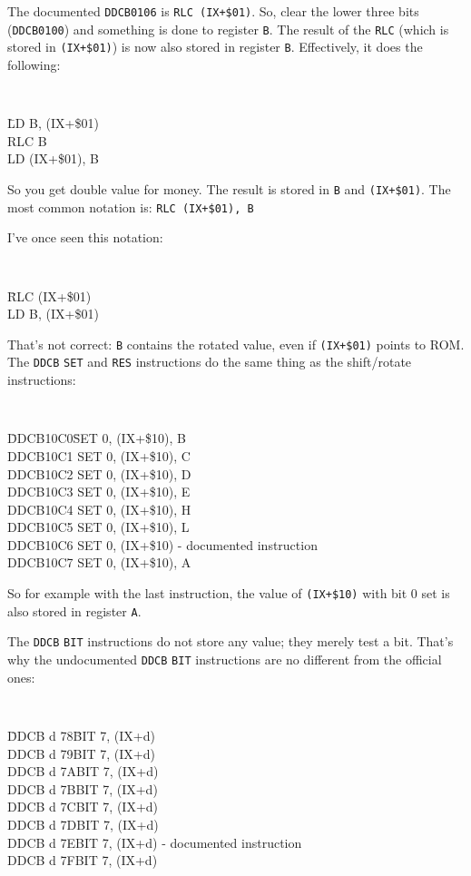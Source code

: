 The documented {\tt DDCB0106} is {\tt RLC (IX+\$01)}. So, clear the lower three bits ({\tt DDCB0100}) and something is done to register {\tt B}. The result of the {\tt RLC} (which is stored in {\tt (IX+\$01)}) is now also stored in register {\tt B}. Effectively, it does the following:

{\tt 
	\begin{tabbing}
		{\qquad}\=LD B, (IX+\$01)\+\\
		RLC B\\
		LD (IX+\$01), B
	\end{tabbing}
}

So you get double value for money. The result is stored in {\tt B} and {\tt (IX+\$01)}. The most common notation is: {\tt RLC (IX+\$01), B}

I've once seen this notation:
 
{\tt 
	\begin{tabbing}
		{\qquad}\=RLC (IX+\$01)\+\\
		LD B, (IX+\$01)
	\end{tabbing}
}

That's not correct: {\tt B} contains the rotated value, even if {\tt (IX+\$01)} points to ROM. The {\tt DDCB} {\tt SET} and {\tt RES} instructions do the same thing as the shift/rotate instructions:

{\tt 
	\begin{tabbing}
		{\qquad}\=DDCB10C0{\qquad}\=SET 0, (IX+\$10), B\+\\
		DDCB10C1	\>SET 0, (IX+\$10), C\\
		DDCB10C2	\>SET 0, (IX+\$10), D\\
		DDCB10C3	\>SET 0, (IX+\$10), E\\
		DDCB10C4	\>SET 0, (IX+\$10), H\\
		DDCB10C5	\>SET 0, (IX+\$10), L\\
		DDCB10C6	\>SET 0, (IX+\$10) {\rm - documented instruction}\\
		DDCB10C7	\>SET 0, (IX+\$10), A
	\end{tabbing}
}

So for example with the last instruction, the value of {\tt (IX+\$10)} with bit 0 set is also stored in register {\tt A}.

The {\tt DDCB} {\tt BIT} instructions do not store any value; they merely test a bit. That's why the undocumented {\tt DDCB} {\tt BIT} instructions are no different from the official ones:

{\tt 
	\begin{tabbing}
		{\qquad}\=DDCB d 78{\qquad}\=BIT 7, (IX+d)\+\\
		DDCB d 79\>BIT 7, (IX+d)\\
		DDCB d 7A\>BIT 7, (IX+d)\\
		DDCB d 7B\>BIT 7, (IX+d)\\
		DDCB d 7C\>BIT 7, (IX+d)\\
		DDCB d 7D\>BIT 7, (IX+d)\\
		DDCB d 7E\>BIT 7, (IX+d) {\rm - documented instruction}\\
		DDCB d 7F\>BIT 7, (IX+d)
	\end{tabbing}
}


